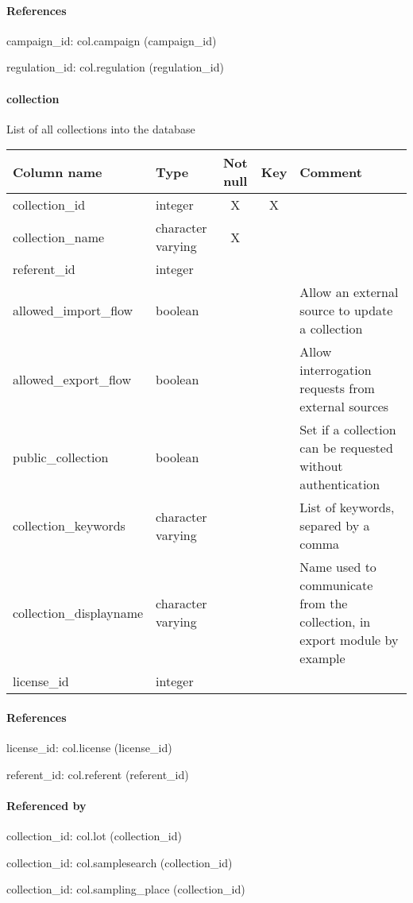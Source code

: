 \paragraph{References}
campaign\_id: col.campaign (campaign\_id)

regulation\_id: col.regulation (regulation\_id)

\paragraph{collection}
List of all collections into the database

\begin{tabular}{|l| p{2cm}|c|c| p{5cm}|}
\hline
Column name & Type & Not null & Key & Comment \\
\hline
collection\_id & integer & X & X & \\
collection\_name & character varying & X &  & \\
referent\_id & integer &  &  & \\
allowed\_import\_flow & boolean &  &  & Allow an external source to update a collection\\
allowed\_export\_flow & boolean &  &  & Allow interrogation requests from external sources\\
public\_collection & boolean &  &  & Set if a collection can be requested without authentication\\
collection\_keywords & character varying &  &  & List of keywords, separed by a comma\\
collection\_displayname & character varying &  &  & Name used to communicate from the collection, in export module by example\\
license\_id & integer &  &  & \\
\hline
\end{tabular}
\paragraph{References}
license\_id: col.license (license\_id)

referent\_id: col.referent (referent\_id)

\paragraph{Referenced by}
collection\_id: col.lot (collection\_id)

collection\_id: col.samplesearch (collection\_id)

collection\_id: col.sampling\_place (collection\_id)

